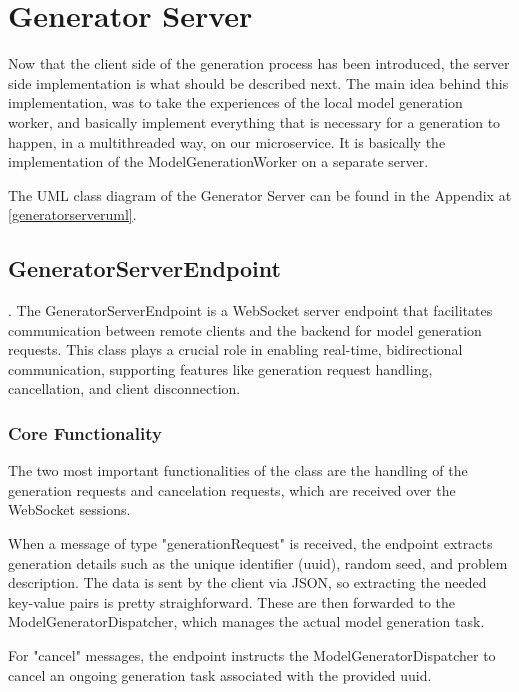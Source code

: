 	\section{Generator Server} \label{Generator Server}
		Now that the client side of the generation process has been introduced, the server side implementation is what should be described next.
		The main idea behind this implementation, was to take the experiences of the local model generation worker, and basically implement everything that 
		is necessary for a generation to happen, in a multithreaded way, on our microservice. It is basically the implementation of the ModelGenerationWorker
		on a separate server.

		The UML class diagram of the Generator Server can be found in the Appendix at \ref{generatorserveruml}.

		\subsection{GeneratorServerEndpoint} \label{GeneratorServerEndpoint}.
			The GeneratorServerEndpoint is a WebSocket server endpoint that facilitates communication between remote clients 
			and the backend for model generation requests. This class plays a crucial role in enabling real-time, 
			bidirectional communication, supporting features like generation request handling, cancellation, and client disconnection.

			\subsubsection{Core Functionality} \label{Core Functionality}
				The two most important functionalities of the class are the handling of the generation requests and cancelation requests, which are
				 received over the 
				WebSocket sessions. 
				
				When a message of type "generationRequest" is received, the endpoint extracts generation details 
				such as the unique identifier (uuid), random seed, and problem description. The data is sent by the client via JSON, so extracting the
				needed key-value pairs is pretty straighforward. These are then forwarded to the ModelGeneratorDispatcher, 
				which manages the actual model generation task.

				\label{serverendpointcancel}For "cancel" messages, the endpoint instructs the ModelGeneratorDispatcher to cancel an ongoing generation task associated with the provided uuid.

